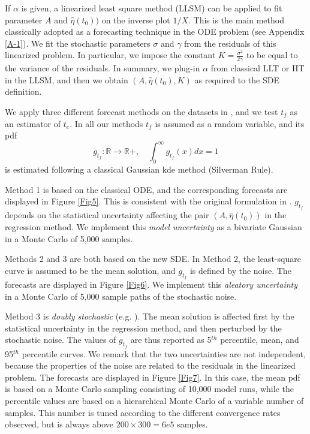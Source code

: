 \documentclass{article}
\begin{document}
If $\alpha$ is given, a linearized least square method (LLSM) can be applied to fit parameter $A$ and $\hat\eta(t_0))$ on the inverse plot $1/X$. This is the main method classically adopted as a forecasting technique in the ODE problem (see Appendix \ref{A-1}). We fit the stochastic parameters $\sigma$ and $\gamma$ from the residuals of this linearized problem. In particular, we impose the constant $K=\frac{\sigma^2}{2\gamma}$ to be equal to the variance of the residuals. In summary, we plug-in $\alpha$ from classical LLT or HT in the LLSM, and then we obtain $\left(A,\hat\eta(t_0),K\right)$ as required to the SDE definition. 

We apply three different forecast methods on the datasets in \cite{Voight1988}, and we test $t_f$ as an estimator of $t_e$. In all our methods $t_f$ is assumed as a random variable, and its pdf
$$g_{t_f}:\mathbb R\rightarrow \mathbb R+,\quad \int_0^\infty g_{t_f}(x) dx=1$$
is estimated following a classical Gaussian kde method (Silverman Rule).

Method 1 is based on the classical ODE, and the corresponding forecasts are displayed in Figure \ref{Fig5}. This is consistent with the original formulation in \cite{Voight1988}. $g_{t_f}$ depends on the statistical uncertainty affecting the pair $(A, \hat\eta(t_0))$ in the regression method. We implement this \emph{model uncertainty} as a bivariate Gaussian in a Monte Carlo of 5,000 samples.

Methods 2 and 3 are both based on the new SDE. In Method 2, the least-square curve is assumed to be the mean solution, and $g_{t_f}$ is defined by the noise. The forecasts are displayed in Figure \ref{Fig6}. We implement this \emph{aleatory uncertainty} in a Monte Carlo of 5,000 sample paths of the stochastic noise.

Method 3 is \emph{doubly stochastic} (e.g. \cite{Bevilacqua2016}). The mean solution is affected first by the statistical uncertainty in the regression method, and then perturbed by the stochastic noise. The values of $g_{t_f}$ are thus reported as 5$^{th}$ percentile, mean, and 95$^{th}$ percentile curves. We remark that the two uncertainties are not independent, because the properties of the noise are related to the residuals in the linearized problem. The forecasts are displayed in Figure \ref{Fig7}. In this case, the mean pdf is based on a Monte Carlo sampling consisting of 10,000 model runs, while the percentile values are based on a hierarchical Monte Carlo of a variable number of samples. This number is tuned according to the different convergence rates observed, but is always above $200\times300=6e5$ samples.
\end{document}
